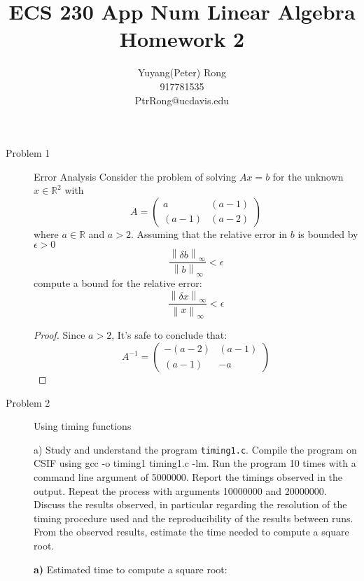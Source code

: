 \documentclass{article}
\title{ECS 230 App Num Linear Algebra \\ Homework 2}
\author{Yuyang(Peter) Rong \\917781535 \\ PtrRong@ucdavis.edu}
\newcommand{\norm}[1]{\left\lVert#1\right\rVert}
\begin{document}
\maketitle

\begin{description}
	\item[Problem 1] Error Analysis
	      Consider the problem of solving $Ax = b$ for the unknown $x \in \mathbb{R}^2$ with
	      \begin{equation}
		      A = \begin{pmatrix} a & (a-1) \\ (a-1) & (a-2)\end{pmatrix}
	      \end{equation}
	      where $a \in \mathbb{R}$ and $a > 2$. Assuming that the relative error in $b$ is bounded by $\epsilon > 0$
	      \begin{equation}
		      \frac{\norm{\delta b}_\infty}{\norm{b}_\infty} < \epsilon
	      \end{equation}
	      compute a bound for the relative error:
	      \begin{equation}
		      \frac{\norm{\delta x}_\infty}{\norm{x}_\infty} < \epsilon
	      \end{equation}

	      \begin{proof}
		      Since $a > 2$, It's safe to conclude that:
		      $$
			      A^{-1} = \begin{pmatrix} -(a-2) & (a-1) \\ (a-1) & -a\end{pmatrix}
		      $$
	      \end{proof}

	\item[Problem 2] Using timing functions

	      a) Study and understand the program \lstinline{timing1.c}.
	      Compile the program on CSIF using gcc -o timing1 timing1.c -lm.
	      Run the program 10 times with a command line argument of 5000000. Report the timings observed in the output. Repeat the process with arguments 10000000 and 20000000.
	      Discuss the results observed, in particular regarding the resolution of the timing procedure used and the reproducibility of the results between runs. From the observed results,
	      estimate the time needed to compute a square root.

	      \textbf{a)}
	      Estimated time to compute a square root:


\end{description}
\end{document}
